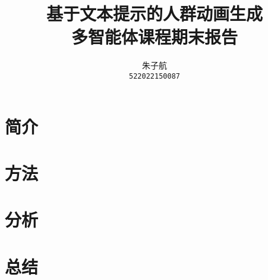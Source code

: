 \documentclass{si_template/cn_note}
\title{\Huge 基于文本提示的人群动画生成 \\ \huge 多智能体课程期末报告}
\author{\hspace{1mm}朱子航\\\texttt{522022150087}}
\begin{document}
\maketitle
\section{简介}\label{sec:introduction}

\section{方法}\label{sec:method}

\section{分析}\label{sec:analysis}

\section{总结}\label{sec:conclusion}




\end{document}
